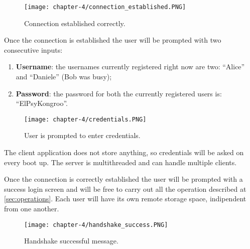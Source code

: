\begin{figure}[!h] 
    \centering 
    \texttt{[image: chapter-4/connection\_established.PNG]} 
    \caption{Connection established correctly.}
    \label{fig:connection_established_prompt}
\end{figure}
\newpage{}
Once the connection is established the user will be prompted with two consecutive inputs:
\begin{enumerate}
	\item \textbf{Username}: the usernames currently registered right now are two: ``Alice'' and ``Daniele'' (Bob was busy);
	\item \textbf{Password}: the password for both the currently registered users is: ``ElPsyKongroo''.
\end{enumerate}

\begin{figure}[!h] 
    \centering 
    \texttt{[image: chapter-4/credentials.PNG]} 
    \caption{User is prompted to enter credentials.}
    \label{fig:credentials}
\end{figure}

\newpage{}

The client application does not store anything, so credentials will be asked on every boot up. The server is multithreaded and can handle multiple clients.

Once the connection is correctly established the user will be prompted with a success login screen and will be free to carry out all the operation described at \ref{sec:operations}. Each user will have its own remote storage space, indipendent from one another.

\begin{figure}[!h] 
    \centering 
    \texttt{[image: chapter-4/handshake\_success.PNG]} 
    \caption{Handshake successful message.}
    \label{fig:handshake_success}
\end{figure}
